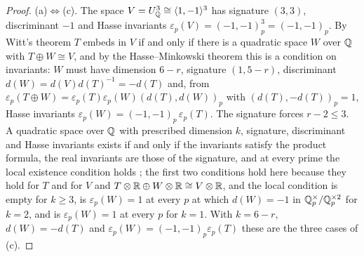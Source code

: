 \begin{proof}
(a)$\Leftrightarrow$(c). The space $V=U_{\mathbb{Q}}^{3}\cong\langle1,-1\rangle^{3}$ has signature $(3,3)$, discriminant $-1$ and Hasse invariants $\varepsilon_{p}(V)=(-1,-1)_{p}^{3}=(-1,-1)_{p}$. By Witt's theorem $T$ embeds in $V$ if and only if there is a quadratic space $W$ over $\mathbb{Q}$ with $T\oplus W\cong V$, and by the Hasse--Minkowski theorem \cite[Ch.~IV, Thm.~9]{Ser73} this is a condition on invariants: $W$ must have dimension $6-r$, signature $(1,5-r)$, discriminant $d(W)=d(V)d(T)^{-1}=-d(T)$ and, from $\varepsilon_{p}(T\oplus W)=\varepsilon_{p}(T)\varepsilon_{p}(W)(d(T),d(W))_{p}$ with $(d(T),-d(T))_{p}=1$, Hasse invariants $\varepsilon_{p}(W)=(-1,-1)_{p}\,\varepsilon_{p}(T)$. The signature forces $r-2\le3$. A quadratic space over $\mathbb{Q}$ with prescribed dimension $k$, signature, discriminant and Hasse invariants exists if and only if the invariants satisfy the product formula, the real invariants are those of the signature, and at every prime the local existence condition holds \cite[Ch.~IV, \S2.3, Prop.~6, and \S3.3, Prop.~7]{Ser73}; the first two conditions hold here because they hold for $T$ and for $V$ and $T\otimes\mathbb{R}\oplus W\otimes\mathbb{R}\cong V\otimes\mathbb{R}$, and the local condition is empty for $k\ge3$, is $\varepsilon_{p}(W)=1$ at every $p$ at which $d(W)=-1$ in $\mathbb{Q}_{p}^{\times}/\mathbb{Q}_{p}^{\times2}$ for $k=2$, and is $\varepsilon_{p}(W)=1$ at every $p$ for $k=1$. With $k=6-r$, $d(W)=-d(T)$ and $\varepsilon_{p}(W)=(-1,-1)_{p}\varepsilon_{p}(T)$ these are the three cases of (c).


\end{proof}
